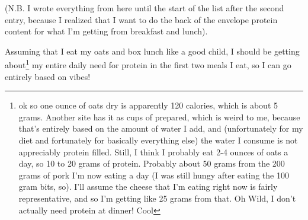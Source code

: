 \documentclass[12pt]{article}[titlepage]
\renewcommand{\,}{\textsuperscript{,}}
\begin{document}
(N.B. I wrote everything from here until the start of the list after the second entry, because I realized that I want to do the back of the envelope protein content for what I'm getting from breakfast and lunch).

Assuming that I eat my oats and box lunch like a good child, I should be getting about\footnote{ok so one ounce of oats dry is apparently 120 calories, which is about 5 grams. Another site has it as cups of prepared, which is weird to me, because that's entirely based on the amount of water I add, and (unfortunately for my diet and fortunately for basically everything else) the water I consume is not appreciably protein filled. Still, I think I probably eat 2-4 ounces of oats a day, so 10 to 20 grams of protein. Probably about 50 grams from the 200 grams of pork I'm now eating a day (I was still hungy after eating the 100 gram bits, so). I'll assume the cheese that I'm eating right now is fairly representative, and so I'm getting like 25 grams from that. Oh Wild, I don't actually need protein at dinner! Cool} my entire daily need for protein in the first two meals I eat, so I can go entirely based on vibes!
\end{document}
